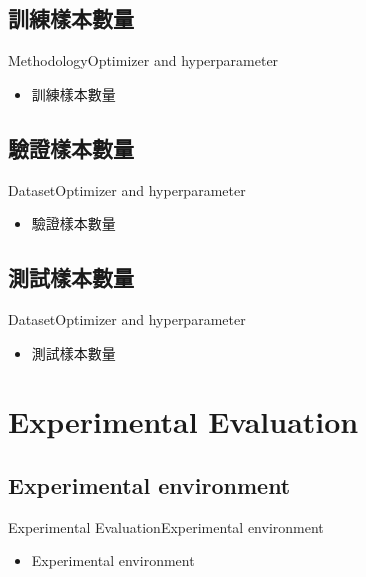 \documentclass{beamer}
\begin{document}
\begin{CJK}{UTF8}{}
\subsection{訓練樣本數量}

\begin{frame}{Methodology}{Optimizer and hyperparameter}
	\begin{itemize}
	\item{
		訓練樣本數量
	}
	\end{itemize}
\end{frame}

\subsection{驗證樣本數量}

\begin{frame}{Dataset}{Optimizer and hyperparameter}
	\begin{itemize}
	\item{
		驗證樣本數量
	}
	\end{itemize}
\end{frame}

\subsection{測試樣本數量}

\begin{frame}{Dataset}{Optimizer and hyperparameter}
	\begin{itemize}
	\item{
		測試樣本數量
	}
	\end{itemize}
\end{frame}

\section{Experimental Evaluation}

\subsection{Experimental environment}

\begin{frame}{Experimental Evaluation}{Experimental environment}
	\begin{itemize}
	\item{
		Experimental environment
	}
	\end{itemize}
\end{frame}


\end{CJK}
\end{document}
